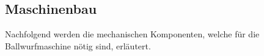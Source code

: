 \subsection{Maschinenbau}
Nachfolgend werden die mechanischen Komponenten, welche für die Ballwurfmaschine nötig sind, erläutert.



\newpage


\newpage


\newpage


\newpage


\newpage

